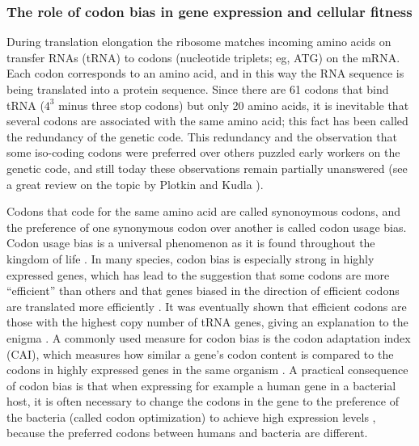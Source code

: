 \subsubsection{The role of codon bias in gene expression and cellular fitness}
During translation elongation the ribosome matches incoming amino acids on
transfer RNAs (tRNA) to codons (nucleotide triplets; eg, ATG) on the mRNA. Each
codon corresponds to an amino acid, and in this way the RNA sequence is being
translated into a protein sequence. Since there are 61 codons that bind tRNA
($4^3$ minus three stop codons) but only 20 amino acids, it is inevitable that
several codons are associated with the same amino acid; this fact has been
called the redundancy of the genetic code. This redundancy and the observation
that some iso-coding codons were preferred over others puzzled early workers on
the genetic code, and still today these observations remain partially
unanswered (see a great review on the topic by Plotkin and Kudla
\cite{plotkin_synonymous_2011}).

Codons that code for the same amino acid are called synonoymous codons, and the
preference of one synonymous codon over another is called codon usage bias.
Codon usage bias is a universal phenomenon as it is found throughout the
kingdom of life \cite{sharp_codon_1988}. In many species, codon bias is
especially strong in highly expressed genes, which has lead to the suggestion
that some codons are more ``efficient'' than others and that genes biased in the
direction of efficient codons are translated more efficiently
\cite{moriyama_gene_1998}. It was eventually shown that efficient codons are
those with the highest copy number of tRNA genes, giving an explanation to the
enigma \cite{reis_solving_2004, elf_selective_2003}. A commonly used measure
for codon bias is the codon adaptation index (CAI), which measures how similar
a gene's codon content is compared to the codons in highly expressed genes in
the same organism \cite{sharp_codon_1987}. A practical consequence of codon
bias is that when expressing for example a human gene in a bacterial host, it
is often necessary to change the codons in the gene to the preference of the
bacteria (called codon optimization) to achieve high expression levels
\cite{gustafsson_codon_2004}, because the preferred codons between humans and
bacteria are different.

